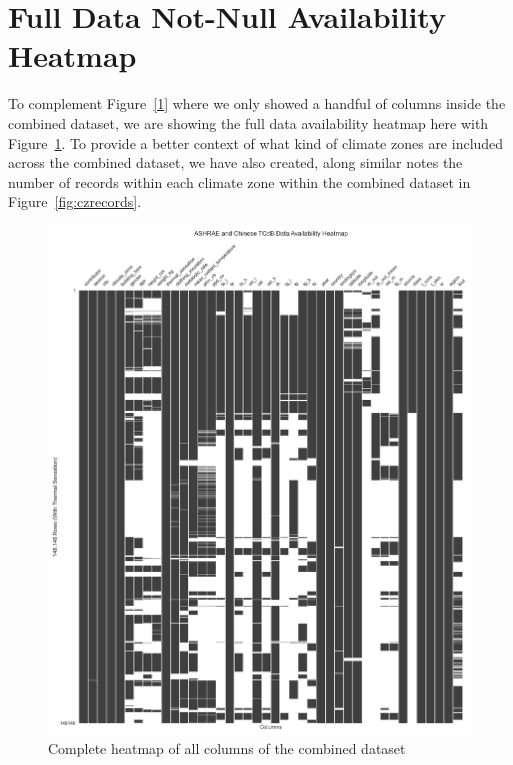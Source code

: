 \documentclass[final,3p,times,12pt]{elsarticle}
\begin{document}
\appendix
\section{Full Data Not-Null Availability Heatmap}
To complement Figure~\ref{1} where we only showed a handful of columns inside the combined dataset, we are showing the full data availability heatmap here with Figure~\ref{fig:fullavail}. To provide a better context of what kind of climate zones are included across the combined dataset, we have also created, along similar notes the number of records within each climate zone within the combined dataset in Figure~\ref{fig:czrecords}.
\begin{figure}[h!]
    \centering
    \includegraphics[width=0.85\linewidth]{FullFill.png}
    \caption{Complete heatmap of all columns of the combined dataset}
    \label{fig:fullavail}
\end{figure}
\end{document}
